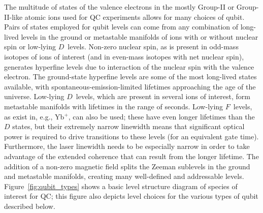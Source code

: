 \documentclass[%
reprint,
 amsmath,amssymb,
]{revtex4-1}
\begin{document}
The multitude of states of the valence electrons in the mostly Group-II or Group-II-like atomic ions used for QC experiments allows for many choices of qubit.  Pairs of states employed for qubit levels can come from any combination of long-lived levels in the ground or metastable manifolds of ions with or without nuclear spin or low-lying $D$~levels.  Non-zero nuclear spin, as is present in odd-mass isotopes of ions of interest (and in even-mass isotopes with net nuclear spin), generates hyperfine levels due to interaction of the nuclear spin with the valence electron.  The ground-state hyperfine levels are some of the most long-lived states available, with spontaneous-emission-limited lifetimes approaching the age of the universe.  Low-lying $D$~levels, which are present in several ions of interest, form metastable manifolds with lifetimes in the range of seconds.  Low-lying $F$~levels, as exist in, e.g., Yb$^{+}$, can also be used; these have even longer lifetimes than the $D$ states, but their extremely narrow linewidth means that significant optical power is required to drive transitions to these levels (for an equivalent gate time).  Furthermore, the laser linewidth needs to be especially narrow in order to take advantage of the extended coherence that can result from the longer lifetime. The addition of a non-zero magnetic field splits the Zeeman sublevels in the ground and metastable manifolds, creating many well-defined and addressable levels.  Figure~\ref{fig:qubit_types} shows  a basic level structure diagram of species of interest for QC; this figure also depicts level choices for the various types of qubit described below.
\end{document}
